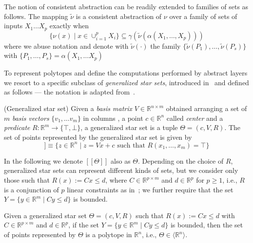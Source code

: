 The notion of consistent abstraction can be readily extended to
families of sets as follows. The mapping $\tilde{\nu}$ is a consistent
abstraction of $\nu$ over a family of sets of inputs $X_1 \ldots X_p$
exactly when 
\begin{equation}
\label{eq:consset}
\{ \nu(x) \mid x \in \cup_{i=1}^p X_i \} \subseteq
\gamma(\tilde{\nu}(\alpha(X_1, \ldots, X_p)))
\end{equation}
where we abuse notation and denote with $\tilde{\nu}(\cdot)$
the family 
$\{ \tilde{\nu}(P_1), \ldots, \tilde{\nu}(P_s) \}$ with
$\{P_1, \ldots, P_s\} = \alpha(X_1, \ldots X_p)$

To represent polytopes and define the computations performed by
abstract layers we resort to a specific subclass of \emph{generalized star
sets}, introduced in~\cite{bak2017simulation} and defined as
follows --- the notation is adapted from~\cite{tran2019star}.

\begin{definition}{(Generalized star set)}
  \normalfont Given a \emph{basis matrix}
  $V \in \mathbb{R}^{n \times m}$ obtained arranging a set of
  $m$ \emph{basis vectors} $\{v_1, \ldots v_m\}$ in columns , a point
  $c \in \mathbb{R}^n$ called \emph{center} and a \emph{predicate} $R 
  : \mathbb{R}^m \to \{\top, \bot\}$, a generalized star set is a
  tuple $\Theta = (c,V,R)$.
  The set of points represented by the generalized star set is given by 
  \begin{equation}
    [ \! [ \Theta  ] \! ]  \equiv \{z \in \mathbb{R}^n \mid z = Vx + c
    \mbox{ such that } R(x_1, \ldots, x_m) = \top\}
  \end{equation}
\end{definition}

In the following we denote $[\![ \Theta ]\!]$ also as
$\Theta$. Depending on the choice of $R$, generalized star sets can
represent different kinds of sets, but 
we consider only those such that $R(x) := Cx \leq d$, where $C \in
\mathbb{R}^{p \times m}$ and $d \in \mathbb{R}^p$ for $p \geq 1$,
i.e., $R$ is a conjunction of $p$ linear constraints
as in~\cite{tran2019star}; we further require that the set $Y = \{y \in
\mathbb{R}^m \mid C y \leq  d\}$ is bounded. 

\begin{proposition}
\label{prop:polistar}
Given a generalized star set $\Theta = (c,V,R)$ such that
$R(x) := Cx \leq d$ with $C \in \mathbb{R}^{p \times m}$ and
$d \in \mathbb{R}^p$, if the set $Y
= \{y \in \mathbb{R}^m \mid C y \leq d\}$ is bounded, then the set of
points represented by  $\Theta$ is a polytope in $\mathbb{R}^n$, i.e.,
$\Theta \in \langle \mathbb{R}^n \rangle$. 
\end{proposition}

